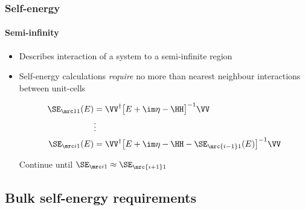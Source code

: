 \begin{frame}
  \frametitle{Self-energy}
  \framesubtitle{Semi-infinity}

  \begin{itemize}
    \item%
    Describes interaction of a system to a semi-infinite region
    
    \item%
    Self-energy calculations \emph{require} no more than nearest neighbour interactions between unit-cells

    \begin{align*}
      \SE_{\mrc 11}(E) &= \VV^\dagger\big[E+\im\eta-\HH\big]^{-1}\VV
      \\
      &\vdots
      \\
      \SE_{\mrc i1}(E) &= \VV^\dagger\big[E+\im\eta-\HH-\SE_{\mrc{i-1}1}(E)\big]^{-1}\VV
    \end{align*}

    Continue until $\SE_{\mrc i1}\approx\SE_{\mrc{i+1}1}$

    \begin{center}
    \end{center}

  \end{itemize}
  
\end{frame}


\subsection{Bulk self-energy requirements}

